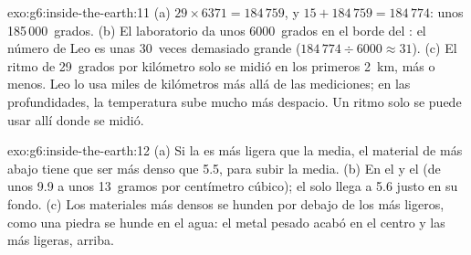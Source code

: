 \begin{solution}{exo:g6:inside-the-earth:11}
(a) $29 \times 6371 = 184\,759$, y $15 + 184\,759 = 184\,774$: unos
185\,000~grados. (b) El laboratorio da unos 6000~grados en el borde del
: el número de Leo es unas 30~veces demasiado grande
($184\,774 \div 6000 \approx 31$). (c) El ritmo de 29~grados por kilómetro
solo se midió en los primeros 2~km, más o menos. Leo lo usa miles de
kilómetros más allá de las mediciones; en las profundidades, la
temperatura sube mucho más despacio. Un ritmo solo se puede usar allí
donde se midió.
\end{solution}

\begin{solution}{exo:g6:inside-the-earth:12}
(a) Si la  es más ligera que la media, el material de más abajo
tiene que ser más denso que 5.5, para subir la media. (b) En el  y el  (de unos 9.9 a unos 13~gramos por centímetro
cúbico); el  solo llega a 5.6 justo en su fondo. (c) Los materiales
más densos se hunden por debajo de los más ligeros, como una piedra se
hunde en el agua: el metal pesado acabó en el centro y las  más
ligeras, arriba.
\end{solution}

